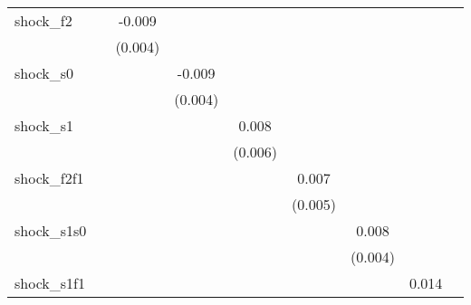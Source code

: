 {\begin{tabular}{l*{8}{c}}
\addlinespace
shock\_f2    &                     &      -0.009\sym{*}  &                     &                     &                     &                     &                     &                     \\
            &                     &     (0.004)         &                     &                     &                     &                     &                     &                     \\
\addlinespace
shock\_s0    &                     &                     &      -0.009\sym{**} &                     &                     &                     &                     &                     \\
            &                     &                     &     (0.004)         &                     &                     &                     &                     &                     \\
\addlinespace
shock\_s1    &                     &                     &                     &       0.008         &                     &                     &                     &                     \\
            &                     &                     &                     &     (0.006)         &                     &                     &                     &                     \\
\addlinespace
shock\_f2f1  &                     &                     &                     &                     &       0.007         &                     &                     &                     \\
            &                     &                     &                     &                     &     (0.005)         &                     &                     &                     \\
\addlinespace
shock\_s1s0  &                     &                     &                     &                     &                     &       0.008\sym{*}  &                     &                     \\
            &                     &                     &                     &                     &                     &     (0.004)         &                     &                     \\
\addlinespace
shock\_s1f1  &                     &                     &                     &                     &                     &                     &       0.014\sym{*}  &                     \\

\end{tabular}}
